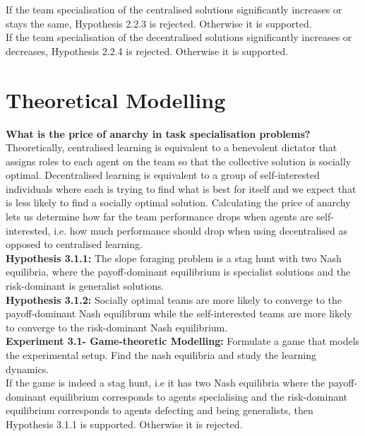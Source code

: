 \documentclass[12pt]{article}
\begin{document}
If the team specialisation of the centralised solutions significantly increases or stays the same, Hypothesis 2.2.3 is rejected.
Otherwise it is supported.\\

If the team specialisation of the decentralised solutions significantly increases or decreases, Hypothesis 2.2.4 is rejected.
Otherwise it is supported.\\

\section{Theoretical Modelling}\label{theoretical_model}

\textbf{What is the price of anarchy in task specialisation problems?}\\

Theoretically, centralised learning is equivalent to a benevolent dictator that assigns roles to each agent on the team so that the collective solution is socially optimal. 
Decentralised learning is equivalent to a group of self-interested individuals where each is trying to find what is best for itself and we expect that is less likely to find a socially optimal solution. 
Calculating the price of anarchy lets us determine how far the team performance drops when agents are self-interested, i.e. how much performance should drop when using decentralised as opposed to centralised learning.\\

\textbf{Hypothesis 3.1.1:} The slope foraging problem is a stag hunt with two Nash equilibria, where the payoff-dominant equilibrium is specialist solutions and the risk-dominant is generalist solutions.\\

\textbf{Hypothesis 3.1.2:} Socially optimal teams are more likely to converge to the payoff-dominant Nash equilibrum while the self-interested teams are more likely to converge to the risk-dominant Nash equilibrium.\\

\textbf{Experiment 3.1- Game-theoretic Modelling:} Formulate a game that models the experimental setup. 
Find the nash equilibria and study the learning dynamics.\\

If the game is indeed a stag hunt, i.e it has two Nash equilibria where the payoff-dominant equilibrium corresponds to agents specialising and the risk-dominant equilibrium corresponds to agents defecting and being generalists, then Hypothesis 3.1.1 is supported.
Otherwise it is rejected.\\
\end{document}
